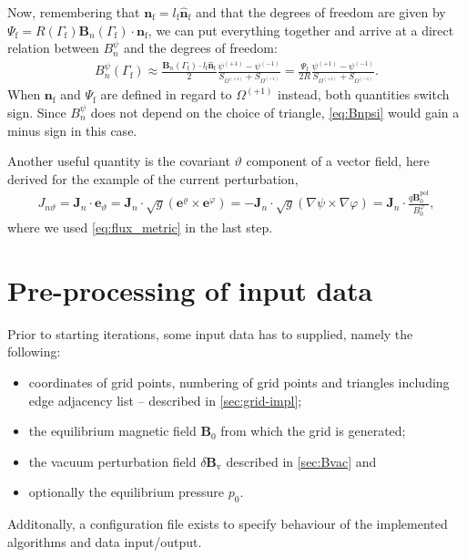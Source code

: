 \documentclass[a4paper, twoside, 10pt, english]{article}
\numberwithin{equation}{section}
\let\temp\varrho
\let\varrho\rho
\let\rho\temp
\let\temp\vartheta
\let\vartheta\theta
\let\theta\temp
\let\temp\varphi
\let\varphi\phi
\let\phi\temp
\let\vec\symbf
\newcommand*\grad{\ensuremath{\nabla}}
\newcommand*\pol{\ensuremath{\textrm{pol}}}  %
\newcommand*\Bvac{\ensuremath{\delta \vec{B}_{\text{v}}}}  %
\newcommand*\fs{\ensuremath{\textrm{f}}}  %
\begin{document}
Now, remembering that $\vec{n}_{\fs} = l_{\fs} \hat{\vec{n}}_{\fs}$ and that the degrees of freedom are given by $\Psi_{\fs} = R (\Gamma_{\fs}) \vec{B}_{n} (\Gamma_{\fs}) \cdot \vec{n}_{\fs}$, we can put everything together and arrive at a direct relation between $B_{n}^{\psi}$ and the degrees of freedom:
\begin{gather}
  B_{n}^{\psi} (\Gamma_{\fs}) \approx \frac{\vec{B}_{n} (\Gamma_{\fs}) \cdot l_{\fs} \hat{\vec{n}}_{\fs}}{2} \frac{\psi^{(+1)} - \psi^{(-1)}}{S_{\Omega^{(+1)}} + S_{\Omega^{(-1)}}} = \frac{\Psi_{\fs}}{2 R} \frac{\psi^{(+1)} - \psi^{(-1)}}{S_{\Omega^{(+1)}} + S_{\Omega^{(-1)}}}. \label{eq:Bnpsi}
\end{gather}
When $\vec{n}_{\fs}$ and $\Psi_{\fs}$ are defined in regard to $\Omega^{(+1)}$ instead, both quantities switch sign. Since $B_{n}^{\psi}$ does not depend on the choice of triangle, \cref{eq:Bnpsi} would gain a minus sign in this case.

Another useful quantity is the covariant $\theta$ component of a vector field, here derived for the example of the current perturbation,
\begin{gather}
  J_{n \theta} = \vec{J}_{n} \cdot \vec{e}_{\theta} = \vec{J}_{n} \cdot \sqrt{g} \left ( \vec{e}^{\rho} \times \vec{e}^{\phi} \right ) = -\vec{J}_{n} \cdot \sqrt{g} (\grad \psi \times \grad \phi) = \vec{J}_{n} \cdot \frac{q \vec{B}_{0}^{\pol}}{B_{0}^{\phi}},
\end{gather}
where we used \cref{eq:flux_metric} in the last step.

\clearpage
\section{Pre-processing of input data}
\label{sec:inputs}

Prior to starting iterations, some input data has to supplied, namely the following:
\begin{itemize}
\item coordinates of grid points, numbering of grid points and triangles including edge adjacency list -- described in \cref{sec:grid-impl};
\item the equilibrium magnetic field $\vec{B}_{0}$ from which the grid is generated;
\item the vacuum perturbation field $\Bvac$ described in \cref{sec:Bvac} and
\item optionally the equilibrium pressure $p_{0}$.
\end{itemize}
Additonally, a configuration file exists to specify behaviour of the implemented algorithms and data input/output.
\end{document}
